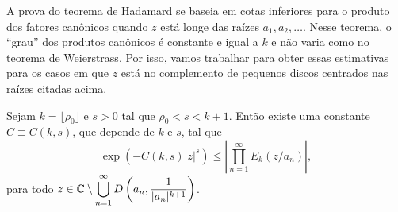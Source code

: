     A prova do teorema de Hadamard se baseia em cotas inferiores para o produto
    dos fatores canônicos quando $z$ está longe das raízes $a_1, a_2, \dots$.
    Nesse teorema, o ``grau'' dos produtos canônicos é constante e igual a $k$
    e não varia como no teorema de Weierstrass. Por isso, vamos trabalhar para obter
    essas estimativas para os casos em que $z$ está no complemento de pequenos discos
    centrados nas raízes citadas acima.
    \begin{lema}
    \label{lema:5.3-Stein}
        Sejam $k = \lfloor \rho_0 \rfloor$ e $s>0$ tal que $\rho_0 < s < k+1$.
        Então existe uma constante $C \equiv C(k,s)$, que depende de $k$ e $s$,
        tal que
        \[
            \exp\left( -C(k,s) |z|^s \right) \leq \left| 
                                             \prod_{n=1}^{\infty} E_k(z/a_n) 
                                             \right|,
        \]
        para todo $z\in\mathbb{C}\setminus\displaystyle\bigcup_{n=1}^{\infty} 
        D\left( a_n, \frac{1}{|a_n|^{k+1}} \right)$.
    \end{lema}

